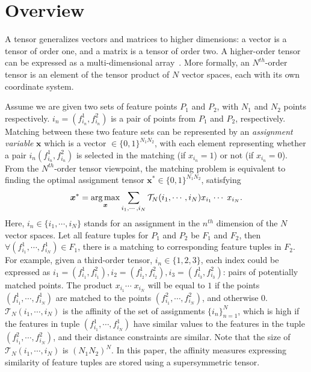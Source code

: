 \section{Overview}
\label{sec:overview}

A tensor generalizes vectors and matrices to higher dimensions: a vector is a tensor of order one,
and a matrix is a tensor of order two. A higher-order tensor can be expressed as a multi-dimensional array~\cite{Kolda08}.
More formally, an $N^{th}$-order tensor is an element of the tensor product of $N$ vector spaces, each with its own coordinate system.

Assume we are given two sets of feature points $P_1$ and $P_2$, with $N_1$ and $N_2$ points respectively.
$i_n = (f^1_{i_n}, f^2_{i_n})$ is a pair of points from $P_1$ and $P_2$, respectively.
Matching between these two feature sets can be represented by an \emph{assignment variable} $\boldsymbol{x}$ which is a vector $\in \{0,1\}^{N_1 N_2}$, with each element representing
whether a pair $i_n(f^1_{i_n}, f^2_{i_n})$ is selected in the matching (if $x_{i_n} = 1$) or not (if $x_{i_n} = 0$).
From the $N^{th}$-order tensor viewpoint,
the matching problem is equivalent to finding the optimal assignment tensor ${\boldsymbol{x}}^*
 \in \{0,1\}^{N_1 N_2}$, satisfying~\cite{Kolda08}
\begin{equation}
\label{equ:assigment}
  {\boldsymbol{x}}^* = \operatorname*{arg\,max}_{\boldsymbol{x}}  \sum_{i_1,\cdots,i_N} \mathcal{T}_N(i_1,\cdots,i_N) x_{i_1}  \cdots\; x_{i_N}.
\end{equation}
Here, $i_n \in \{i_1,\cdots ,i_N\}$ stands for an assignment in the $n^{th}$ dimension of the $N$ vector spaces.
Let all feature tuples for $P_1$ and $P_2$ be $F_1$ and $F_2$, then $\forall (f_{i_1}^1, \cdots, f_{i_N}^1)\in F_1$,
there is a matching to corresponding feature tuples in $F_2$.
For example, given a third-order tensor, $i_n \in \{1,2,3\}$,
each index could be expressed as $i_1=(f_{i_1}^1,f_{i_1}^2), i_2=(f_{i_2}^1,f_{i_2}^2), i_3=(f_{i_3}^1,f_{i_3}^2)$: pairs of potentially matched points.
The product $x_{i_1} \cdots\;x_{i_N}$ will be equal to $1$ if the points $(f_{i_1}^1, \cdots, f_{i_N}^1)$ are matched to the points $(f_{i_1}^2, \cdots, f_{i_N}^2)$,
and otherwise 0.
$\mathcal{T}_N(i_1,\cdots,i_N)$ is the affinity of the set of assignments $\{i_n\}_{n=1}^N$,
which is high if the features in tuple $(f_{i_1}^1, \cdots, f_{i_N}^1)$  have similar values to the features in the tuple $(f_{i_1}^2, \cdots, f_{i_N}^2)$,
and their distance constraints are similar.
Note that the size of $\mathcal{T}_N(i_1,\cdots,i_N)$ is ${(N_1N_2)}^N$.
In this paper, the affinity measures expressing similarity of feature tuples are stored using a supersymmetric tensor.

